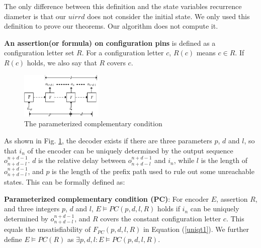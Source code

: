 \documentclass[journal]{IEEEtran}
\begin{document}
The only difference between this definition and the state variables recurrence diameter\cite{RecDiam} is that
our $uirrd$ does not consider the initial state.
We only used this definition to prove our theorems.
Our algorithm does not compute it.

\textbf{An assertion(or formula) on configuration pins} is defined as a configuration letter set $R$.
For a configuration letter $c$,
$R(c)$ means $c\in R$.
If $R(c)$ holds,
we also say that $R$ covers $c$.

\begin{figure}[b]
\begin{center}
\includegraphics[width=0.35\textwidth]{t1}
\end{center}
\caption{The parameterized complementary condition}
  \label{t1}
\end{figure}

As shown in Fig. \ref{t1},
the decoder exists if there are three parameters $p$, $d$ and $l$,
so that $i_n$ of the encoder can be uniquely determined by the output sequence $o_{n+d-l}^{n+d-1}$.
$d$ is the relative delay between $o_{n+d-l}^{n+d-1}$ and $i_n$,
while $l$ is the length of $o_{n+d-l}^{n+d-1}$,
and $p$ is the length of the prefix path used to rule out some unreachable states.
This can be formally defined as:

\begin{definition11}\label{def_pcc}%
\textbf{Parameterized complementary condition (PC)}:
For encoder $E$,
assertion $R$,
and three integers $p$, $d$ and $l$,
$E\vDash PC(p,d,l,R)$ holds if
$i_n$ can be uniquely determined by $o_{n+d-l}^{n+d-1}$,
and $R$ covers the constant configuration letter $c$.
This equals the unsatisfiability of $F_{PC}(p,d,l,R)$ in Equation (\ref{uniqt1}).
We further define $E\vDash PC(R)$ as $\exists p,d,l:E\vDash PC(p,d,l,R)$.
\end{definition11}
\end{document}
